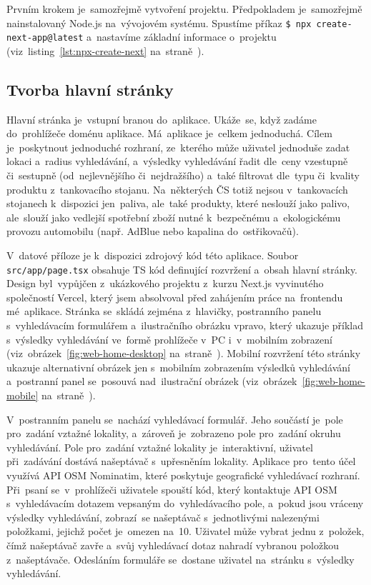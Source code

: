 Prvním krokem je~samozřejmě vytvoření projektu. Předpokladem je~samozřejmě
nainstalovaný Node.js na~vývojovém systému. Spustíme příkaz
\texttt{\$ npx create-next-app@latest} a~nastavíme základní informace
o~projektu (viz~listing~\ref{lst:npx-create-next}
na~straně~\pageref{lst:npx-create-next}).

\subsection{Tvorba hlavní stránky}

Hlavní stránka je~vstupní branou do~aplikace. Ukáže~se, když zadáme
do~prohlížeče doménu aplikace. Má~aplikace je~celkem jednoduchá. Cílem
je~poskytnout jednoduché rozhraní, ze~kterého může uživatel jednoduše
zadat lokaci a~radius vyhledávání, a~výsledky vyhledávání řadit dle~ceny
vzestupně či~sestupně (od~nejlevnějšího či~nejdražšího) a~také filtrovat
dle~typu či~kvality produktu z~tankovacího stojanu. Na~některých ČS totiž
nejsou v~tankovacích stojanech k~dispozici jen~paliva, ale~také produkty,
které neslouží jako palivo, ale~slouží jako vedlejší spotřební zboží nutné
k~bezpečnému a~ekologickému provozu automobilu (např. AdBlue nebo kapalina
do~ostřikovačů).

V~datové příloze je k~dispozici zdrojový kód této aplikace. Soubor
\texttt{src/app/page.tsx} obsahuje TS kód definující rozvržení a~obsah
hlavní stránky. Design byl~vypůjčen z~ukázkového projektu z~kurzu Next.js
vyvinutého společností Vercel, který jsem absolvoval před zahájením práce
na~frontendu mé~aplikace. Stránka se~skládá zejména z~hlavičky,
postranního panelu s~vyhledávacím formulářem a~ilustračního obrázku vpravo,
který ukazuje příklad s~výsledky vyhledávání ve~formě prohlížeče v~PC
i~v~mobilním zobrazení (viz~obrázek~\ref{fig:web-home-desktop}
na~straně~\pageref{fig:web-home-desktop}). Mobilní rozvržení této stránky
ukazuje alternativní obrázek jen s~mobilním zobrazením výsledků vyhledávání
a~postranní panel se~posouvá nad~ilustrační obrázek
(viz~obrázek~\ref{fig:web-home-mobile}
na~straně~\pageref{fig:web-home-mobile}).

V~postranním panelu se~nachází vyhledávací formulář. Jeho součástí je~pole
pro~zadání vztažné lokality, a~zároveň je~zobrazeno pole pro~zadání okruhu
vyhledávání. Pole pro~zadání vztažné lokality je~interaktivní, uživatel
při~zadávání dostává našeptávač s~upřesněním lokality. Aplikace pro~tento účel
využívá API OSM Nominatim, které poskytuje geografické vyhledávací rozhraní.
Při~psaní se~v~prohlížeči uživatele spouští kód, který kontaktuje API OSM
s~vyhledávacím dotazem vepsaným do~vyhledávacího pole, a~pokud jsou vráceny
výsledky vyhledávání, zobrazí~se našeptávač s~jednotlivými nalezenými
položkami, jejichž počet je~omezen na~10. Uživatel může vybrat jednu
z~položek, čímž našeptávač zavře a~svůj vyhledávací dotaz nahradí vybranou
položkou z~našeptávače. Odesláním formuláře se~dostane uživatel na~stránku
s~výsledky vyhledávání.

